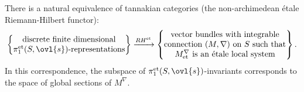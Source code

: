 \begin{thm}\label{thm::3.4.6} There is a natural equivalence of tannakian
 categories (the {\rm non-archimedean \'etale Riemann-Hilbert functor}):
 \begin{equation*}
  \left\{
   \begin{matrix}
    \text{discrete finite dimensional}\\
    \pi_1^{\mathrm{et}}(S, \ovl{s})\text{-representations}
   \end{matrix}
   \right\}
   \xrightarrow{RH^{\mathrm{et}}}
   \left\{
    \begin{matrix}
     \text{vector bundles with integrable}\\
     \text{connection $(M,\nabla)$ on $S$ such that}\\
     \text{$M_{\mathrm{et}}^\nabla$ is an \'etale local system}
    \end{matrix}
   \right\}.
 \end{equation*}
 In this correspondence, the subspace of 
 $\pi_1^{\mathrm{et}}(S, \ovl{s})$-invariants corresponds to the
 space of global sections of $M^\nabla$.
\end{thm}

